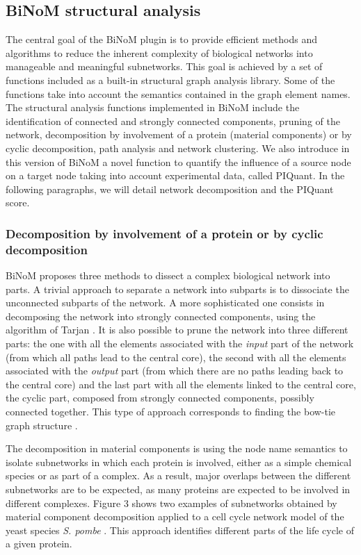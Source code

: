 \documentclass[10pt]{bmc_article}
\newenvironment{bmcformat}{\baselineskip20pt\sloppy\setboolean{publ}{false}}{\baselineskip20pt\sloppy}
\begin{document}
\begin{bmcformat}
\subsection*{BiNoM structural analysis}
The central goal of the BiNoM plugin is to provide efficient methods
and algorithms to reduce the inherent complexity of biological networks into
manageable and meaningful subnetworks. This goal is achieved by a set of
functions included as a built-in structural graph analysis library. Some of the functions take into
account the semantics contained in the graph element names.
The structural analysis functions implemented in BiNoM include the identification of
connected and strongly connected components, pruning of the network, decomposition
by involvement of a protein (material components) or by cyclic decomposition, path analysis and network clustering.
We also introduce in this version of BiNoM a novel function to quantify the
influence of a source node on a target node taking into account experimental
data, called PIQuant. In the following paragraphs, we will detail network
decomposition and the PIQuant score.

\subsubsection*{Decomposition by involvement of a protein or by cyclic decomposition}

BiNoM proposes three methods to dissect a complex biological network into parts.
A trivial approach to separate a network into subparts is to dissociate the unconnected subparts
of the network. A more sophisticated one consists in decomposing the network into
strongly connected components, using the algorithm of Tarjan
\cite{tarjan1972depth}. It is also possible to prune the network into three different parts:
the one with all the elements associated with the \emph{input} part of the network (from which all paths lead to the central core), the
second with all the elements associated with the \emph{output} part (from which there are no paths leading back to the central core) and the last
part with all the elements linked to the central core, the cyclic part, composed from strongly connected components, possibly connected together.
This type of approach corresponds to finding the bow-tie graph structure \cite{broder2000graph}.

The decomposition in material components is using the node name semantics to
isolate subnetworks in which each protein is involved, either as a simple chemical species or as part of a complex. As a result, major overlaps between
the different subnetworks are to be expected, as many proteins are expected to be involved in
different complexes. Figure 3 shows two examples of subnetworks
obtained by material component decomposition applied to a cell cycle network
model of the yeast species \textit{S. pombe} \cite{novak1998model}. This approach identifies
different parts of the life cycle of a given protein.


\end{bmcformat}
\end{document}
